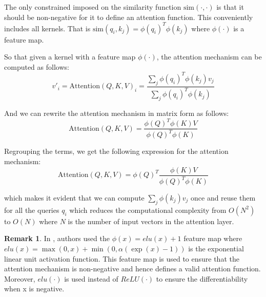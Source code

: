 \documentclass[a4paper, twoside]{report}
\theoremstyle{definition}
\newtheorem{remark}[theorem]{Remark}
\numberwithin{equation}{section}
\begin{document}
The only constrained imposed on the similarity function $\text{sim}(\cdot, \cdot)$ is that it should be non-negative for it to define an attention function.
This conveniently includes all kernels. That is $\text{sim}(q_i, k_j)=\phi(q_i)^T \phi(k_j)$ where $\phi(\cdot)$ is a feature map.

So that given a kernel with a feature map $\phi(\cdot)$, the attention mechanism can be computed as follows:
\begin{equation}
    v'_i=\text{Attention}(Q, K, V)_i=\frac{\sum_j \phi(q_i)^T \phi(k_j) v_j}{\sum_j \phi(q_i)^T \phi(k_j)}
\end{equation}

And we can rewrite the attention mechanism in matrix form as follows:
\begin{equation}
    \text{Attention}(Q, K, V)=\frac{\phi(Q)^T \phi(K) V}{\phi(Q)^T \phi(K)}
\end{equation}

Regrouping the terms, we get the following expression for the attention mechanism:
\begin{equation}
    \text{Attention}(Q, K, V)=\phi(Q)^T \frac{\phi(K) V}{\phi(Q)^T \phi(K)}
\end{equation}

which makes it evident that we can compute $\sum_j \phi(k_j) v_j$ once and reuse them for all the queries $q_i$
which reduces the computational complexity from $O(N^2)$ to $O(N)$ where $N$ is the number of input vectors
in the attention layer.

\begin{remark}
    In \cite{2006.16236}, authors used the $\phi(x)=elu(x)+1$ feature map where
    $elu(x)=\max(0, x)+\min(0, \alpha(\exp(x)-1))$ is the exponential linear unit activation function.
    This feature map is used to ensure that the attention mechanism is non-negative
    and hence defines a valid attention function. Moreover, $elu(\cdot)$ is used instead of $ReLU(\cdot)$
    to ensure the differentiability when x is negative.
\end{remark}




\end{document}
